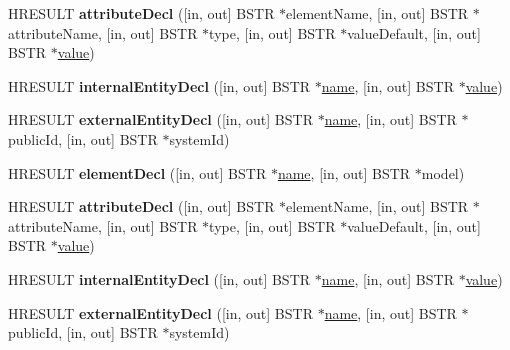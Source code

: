 \begin{DoxyCompactItemize}
H\+R\+E\+S\+U\+LT {\bfseries attribute\+Decl} (\mbox{[}in, out\mbox{]} B\+S\+TR $\ast$element\+Name, \mbox{[}in, out\mbox{]} B\+S\+TR $\ast$attribute\+Name, \mbox{[}in, out\mbox{]} B\+S\+TR $\ast$type, \mbox{[}in, out\mbox{]} B\+S\+TR $\ast$value\+Default, \mbox{[}in, out\mbox{]} B\+S\+TR $\ast$\hyperlink{unionvalue}{value})
\item 
\mbox{\label{interface_m_s_x_m_l2_1_1_i_v_b_s_a_x_decl_handler_a0127ed96e123f0bec97b9cd6a73bac31}} 
H\+R\+E\+S\+U\+LT {\bfseries internal\+Entity\+Decl} (\mbox{[}in, out\mbox{]} B\+S\+TR $\ast$\hyperlink{structname}{name}, \mbox{[}in, out\mbox{]} B\+S\+TR $\ast$\hyperlink{unionvalue}{value})
\item 
\mbox{\label{interface_m_s_x_m_l2_1_1_i_v_b_s_a_x_decl_handler_aa042d45b3a26da6c5e85fe91aa8d50b1}} 
H\+R\+E\+S\+U\+LT {\bfseries external\+Entity\+Decl} (\mbox{[}in, out\mbox{]} B\+S\+TR $\ast$\hyperlink{structname}{name}, \mbox{[}in, out\mbox{]} B\+S\+TR $\ast$public\+Id, \mbox{[}in, out\mbox{]} B\+S\+TR $\ast$system\+Id)
\item 
\mbox{\label{interface_m_s_x_m_l2_1_1_i_v_b_s_a_x_decl_handler_a622d111eb247853a526a2771b19ec529}} 
H\+R\+E\+S\+U\+LT {\bfseries element\+Decl} (\mbox{[}in, out\mbox{]} B\+S\+TR $\ast$\hyperlink{structname}{name}, \mbox{[}in, out\mbox{]} B\+S\+TR $\ast$model)
\item 
\mbox{\label{interface_m_s_x_m_l2_1_1_i_v_b_s_a_x_decl_handler_aaa7a2aad3ae3694f9df7ccc2a30b19cd}} 
H\+R\+E\+S\+U\+LT {\bfseries attribute\+Decl} (\mbox{[}in, out\mbox{]} B\+S\+TR $\ast$element\+Name, \mbox{[}in, out\mbox{]} B\+S\+TR $\ast$attribute\+Name, \mbox{[}in, out\mbox{]} B\+S\+TR $\ast$type, \mbox{[}in, out\mbox{]} B\+S\+TR $\ast$value\+Default, \mbox{[}in, out\mbox{]} B\+S\+TR $\ast$\hyperlink{unionvalue}{value})
\item 
\mbox{\label{interface_m_s_x_m_l2_1_1_i_v_b_s_a_x_decl_handler_a0127ed96e123f0bec97b9cd6a73bac31}} 
H\+R\+E\+S\+U\+LT {\bfseries internal\+Entity\+Decl} (\mbox{[}in, out\mbox{]} B\+S\+TR $\ast$\hyperlink{structname}{name}, \mbox{[}in, out\mbox{]} B\+S\+TR $\ast$\hyperlink{unionvalue}{value})
\item 
\mbox{\label{interface_m_s_x_m_l2_1_1_i_v_b_s_a_x_decl_handler_aa042d45b3a26da6c5e85fe91aa8d50b1}} 
H\+R\+E\+S\+U\+LT {\bfseries external\+Entity\+Decl} (\mbox{[}in, out\mbox{]} B\+S\+TR $\ast$\hyperlink{structname}{name}, \mbox{[}in, out\mbox{]} B\+S\+TR $\ast$public\+Id, \mbox{[}in, out\mbox{]} B\+S\+TR $\ast$system\+Id)
\end{DoxyCompactItemize}
